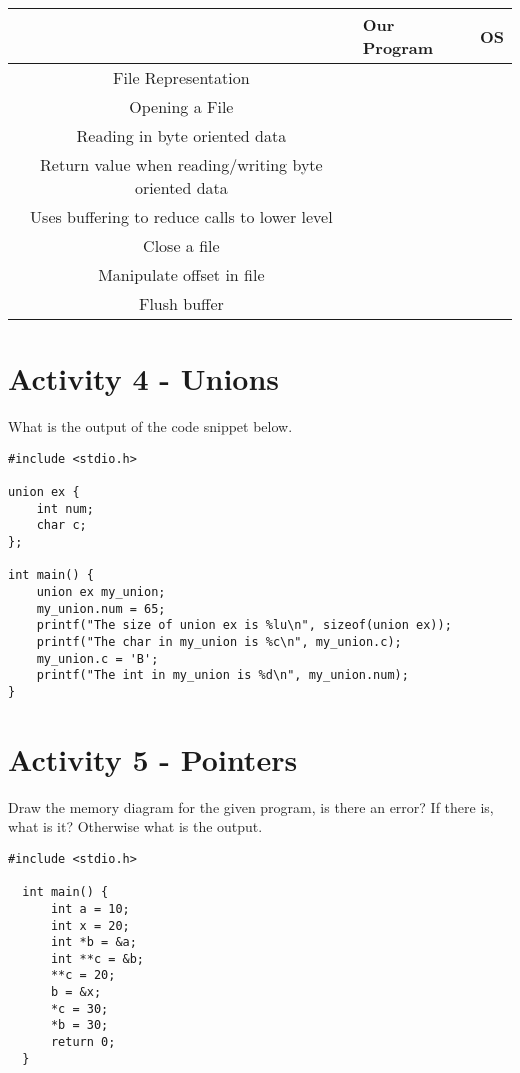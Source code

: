 \documentclass[]{article}
\begin{document}
\begin{centering}
    \begin{tabular}{|c|p{4cm}|p{5cm}|}
        \hline
        & Our Program & OS \\
        \hline
        File Representation & & \\
        \hline
        Opening a File & & \\
        \hline
        Reading in byte oriented data & & \\
        \hline
        Return value when reading/writing byte oriented data & & \\
        \hline
        Uses buffering to reduce calls to lower level & & \\
        \hline
        Close a file & & \\
        \hline
        Manipulate offset in file & & \\
        \hline
        Flush buffer & & \\
        \hline
    \end{tabular}
\end{centering}

\section*{Activity 4 - Unions}
What is the output of the code snippet below.

\begin{lstlisting}
#include <stdio.h>

union ex {
    int num;
    char c;
};

int main() {
    union ex my_union;
    my_union.num = 65;
    printf("The size of union ex is %lu\n", sizeof(union ex));
    printf("The char in my_union is %c\n", my_union.c);
    my_union.c = 'B';
    printf("The int in my_union is %d\n", my_union.num);
}
\end{lstlisting}

\section*{Activity 5 - Pointers}
Draw the memory diagram for the given program, is there an error? If there is, what is it? Otherwise
what is the output.
\begin{lstlisting}
#include <stdio.h>

  int main() {
      int a = 10;
      int x = 20;
      int *b = &a;
      int **c = &b;
      **c = 20;
      b = &x;
      *c = 30;
      *b = 30;
      return 0;
  }
\end{lstlisting}
\end{document}
